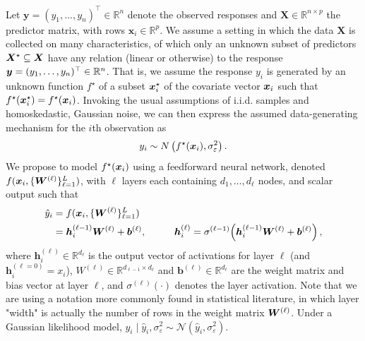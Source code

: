 Let $\mathbf{y} = (y_1, \ldots, y_n)^\top \in \mathbb{R}^n$
denote the observed responses and
$\mathbf{X} \in \mathbb{R}^{n \times p}$ the predictor matrix,
with rows $\mathbf{x}_i \in \mathbb{R}^p$.  
We assume a setting in which the data $\mathbf{X}$ is collected on many characteristics, of which only an unknown subset of predictors $\bm{X}^\star \subseteq \bm{X}$ have any relation (linear or otherwise) to the response $\bm{y} = (y_1, \ldots, y_n)^\top \in \mathbb{R}^n$.  That is, we assume the response $y_i$ is generated by an unknown function $f^\star$ of a subset $\bm{x}^\star_i$ of the covariate vector $\bm{x}_i$ such that $f^\star(\bm{x}^\star_i) = f^\star(\bm{x}_i)$.  Invoking the usual assumptions of i.i.d. samples and homoskedastic, Gaussian noise, we can then express the assumed data-generating mechanism for the $i$th observation as
\begin{equation}
    y_i \sim N \left( f^\star (\bm{x}_i), \sigma_\varepsilon^2 \right).
\end{equation}
We propose to model $f^\star(\bm{x}_i)$ using a feedforward neural network, denoted $f(\bm{x}_i, \{\bm{W}^{(\ell)}\}^L_{\ell=1})$, with $\ell$ layers each containing 
$d_1, \ldots, d_\ell$ nodes, and scalar output such that
\begin{equation}
    \begin{aligned}
        \hat{y}_i 
            & = f(\bm{x}_i, \{\bm{W}^{(\ell)}\}^L_{\ell=1}) \\
            & = \bm{h}_i^{(\ell-1)} \bm{W}^{(\ell)} + \bm{b}^{(\ell)},
            \qquad
            & {\bm{h}}_i^{(\ell)}
            = \sigma^{(\ell-1)}\!\left({\bm{h}}_i^{(\ell-1)} \bm{W}^{(\ell)} + \bm{b}^{(\ell)} \right),  
    \end{aligned}
    \label{eq:network}
\end{equation}
where $\bm{h}_i^{(\ell)} \in \mathbb{R}^{d_\ell}$ is the output vector of activations for layer $\ell$ 
(and $\bm{h}_i^{(\ell=0)} = x_i$), 
$W^{(\ell)} \in \mathbb{R}^{d_{\ell-1} \times d_{\ell}}$ and $\bm{b}^{(\ell)} \in \mathbb{R}^{d_\ell}$
are the weight matrix and bias vector at layer $\ell$, and 
$\sigma^{(\ell)}(\cdot)$ denotes the layer activation.  Note that we are using a notation more commonly found in statistical literature, in which layer "width" is actually the number of rows in the weight matrix $\bm{W}^{(\ell)}$. Under a Gaussian likelihood
model, $y_i \mid \hat{y}_i, \sigma_\varepsilon^2 \sim
\mathcal{N}(\hat{y}_i, \sigma_\varepsilon^2)$.

